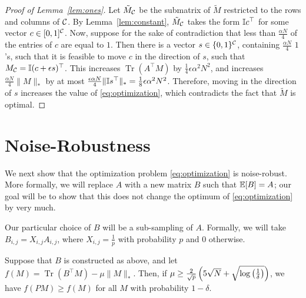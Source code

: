 \documentclass[11pt]{article}
\DeclareMathOperator{\Tr}{Tr}
\newcommand{\M}{\tilde{M}}
\begin{document}
\begin{proof}[Proof of Lemma~\ref{lem:ones}]
Let $\M_{\sC}$ be the submatrix of $\M$ restricted 
to the rows and columns of $\mathcal{C}$. By Lemma~\ref{lem:constant}, 
$\M_{\sC}$ takes the form $\mathbb{I} c^{\top}$ for some vector 
$c \in [0,1]^{\mathcal{C}}$. Now, suppose for the sake of contradiction 
that less than $\frac{\alpha N}{4}$ of the entries of $c$ 
are equal to $1$. Then there is a vector 
$s \in \{0,1\}^{\mathcal{C}}$, containing $\frac{\alpha N}{4}$ 
$1$'s, such that it is feasible to move $c$ in the direction of 
$s$, such that $M_{\mathcal{C}} = \mathbb{I} (c+\epsilon s)^{\top}$. This 
increases $\Tr(A^{\top}M)$ by $\frac{1}{4}\epsilon \alpha^2 N^2$, 
and increases $\frac{\alpha N}{4}\|M\|_*$ by at most 
$\frac{\epsilon \alpha N}{4}\|\mathbb{I} s^{\top}\|_* = \frac{1}{8}\epsilon \alpha^2 N^2$. 
Therefore, moving in the direction of $s$ increases the value of 
\eqref{eq:optimization}, which contradicts the fact that $\M$ is optimal.
\end{proof}

\section{Noise-Robustness}

We next show that the optimization problem \eqref{eq:optimization} is 
noise-robust. More formally, we will replace $A$ with a new matrix $B$ 
such that $\mathbb{E}[B] = A$; our goal will be to show that this does 
not change the optimum of \eqref{eq:optimization} by very much.

Our particular choice of $B$ will be a sub-sampling of $A$. Formally, 
we will take $B_{i,j} = X_{i,j}A_{i,j}$, where $X_{i,j} = \frac{1}{p}$ 
with probability $p$ and $0$ otherwise.

\begin{proposition}
Suppose that $B$ is constructed as above, and let $f(M) = \Tr(B^{\top}M) - \mu \|M\|_*$. 
Then, if $\mu \geq \frac{2}{\sqrt{p}}\left(5\sqrt{N} + \sqrt{\log\left(\frac{1}{\delta}\right)}\right)$, we 
have $f(PM) \geq f(M)$ for all $M$ with probability $1-\delta$.
\end{proposition}
\end{document}
